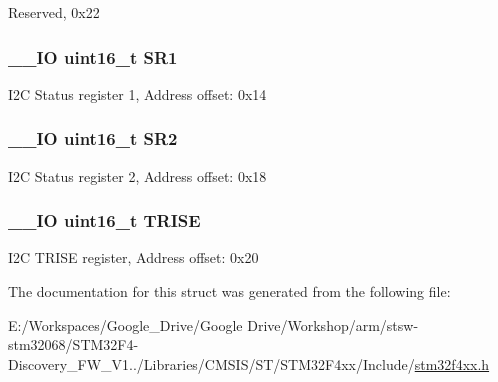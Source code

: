 Reserved, 0x22 \hypertarget{struct_i2_c___type_def_a1e79a16729e8d1032d9fe552d50dce41}{
\subsubsection[{S\-R1}]{\setlength{\rightskip}{0pt plus 5cm}\-\_\-\-\_\-\-I\-O uint16\-\_\-t S\-R1}}\label{struct_i2_c___type_def_a1e79a16729e8d1032d9fe552d50dce41}
I2\-C Status register 1, Address offset\-: 0x14 \hypertarget{struct_i2_c___type_def_a682809d3f8187cdefb9d615e89b67e65}{
\subsubsection[{S\-R2}]{\setlength{\rightskip}{0pt plus 5cm}\-\_\-\-\_\-\-I\-O uint16\-\_\-t S\-R2}}\label{struct_i2_c___type_def_a682809d3f8187cdefb9d615e89b67e65}
I2\-C Status register 2, Address offset\-: 0x18 \hypertarget{struct_i2_c___type_def_a7fbb70132ee565bb179078b6ee20cc2b}{
\subsubsection[{T\-R\-I\-S\-E}]{\setlength{\rightskip}{0pt plus 5cm}\-\_\-\-\_\-\-I\-O uint16\-\_\-t T\-R\-I\-S\-E}}\label{struct_i2_c___type_def_a7fbb70132ee565bb179078b6ee20cc2b}
I2\-C T\-R\-I\-S\-E register, Address offset\-: 0x20 

The documentation for this struct was generated from the following file\-:\begin{DoxyCompactItemize}
\item 
E\-:/\-Workspaces/\-Google\-\_\-\-Drive/\-Google Drive/\-Workshop/arm/stsw-\/stm32068/\-S\-T\-M32\-F4-\/\-Discovery\-\_\-\-F\-W\-\_\-\-V1../\-Libraries/\-C\-M\-S\-I\-S/\-S\-T/\-S\-T\-M32\-F4xx/\-Include/\hyperlink{stm32f4xx_8h}{stm32f4xx.\-h}\end{DoxyCompactItemize}
